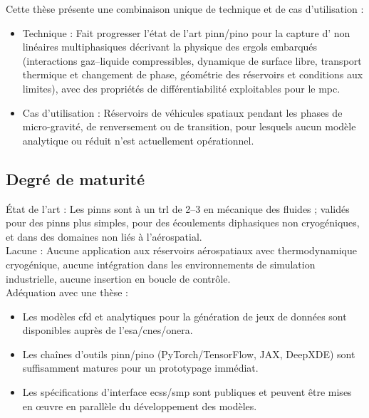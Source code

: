 \documentclass[12pt]{article}
\begin{document}
	
	
	Cette thèse présente une combinaison unique de technique et de cas d’utilisation :
	
	\begin{itemize}
		\item Technique : Fait progresser l’état de l’art \acrshort{pinn}/\acrshort{pino} pour la capture d’ non linéaires multiphasiques décrivant la physique des ergols embarqués (interactions gaz–liquide compressibles, dynamique de surface libre, transport thermique et changement de phase, géométrie des réservoirs et conditions aux limites), avec des propriétés de différentiabilité exploitables pour le \gls{mpc}.
		
		\item Cas d’utilisation : Réservoirs de véhicules spatiaux pendant les phases de micro-gravité, de renversement ou de transition, pour lesquels aucun modèle analytique ou réduit n’est actuellement opérationnel.
	\end{itemize}
	
	
	\subsection*{Degré de maturité}
	
	
	État de l’art : Les \acrshort{pinn}s sont à un \acrshort{trl} de 2–3 en mécanique des fluides ; validés pour des \acrshort{pinn}s plus simples, pour des écoulements diphasiques non cryogéniques, et dans des domaines non liés à l’aérospatial.
	\\
	
	Lacune : Aucune application aux réservoirs aérospatiaux avec thermodynamique cryogénique, aucune intégration dans les environnements de simulation industrielle, aucune insertion en boucle de contrôle.
	\\
	
	Adéquation avec une thèse :
	
	\begin{itemize}
		\item Les modèles \acrshort{cfd} et analytiques pour la génération de jeux de données sont disponibles auprès de l’\acrshort{esa}/\acrshort{cnes}/\acrshort{onera}.
		
		\item Les chaînes d’outils \acrshort{pinn}/\acrshort{pino} (PyTorch/TensorFlow, JAX, DeepXDE) sont suffisamment matures pour un prototypage immédiat.
		
		\item Les spécifications d’interface \acrshort{ecss}/\acrshort{smp} sont publiques et peuvent être mises en œuvre en parallèle du développement des modèles.
		
	\end{itemize}	
	
\end{document}
